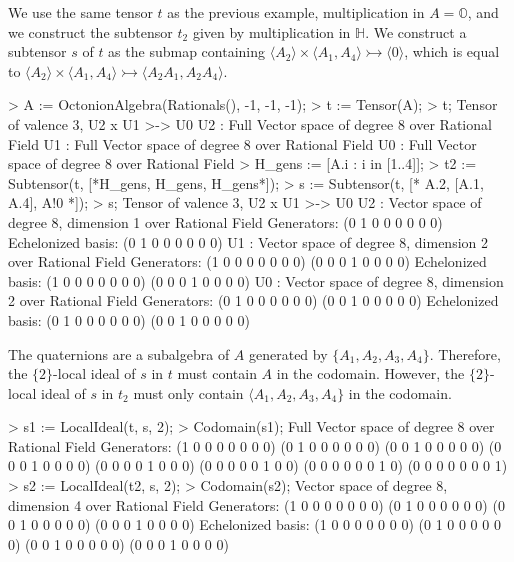 \begin{example}[LocalIdeals]

We use the same tensor $t$ as the previous example, multiplication in $A=\mathbb{O}$, and we construct the subtensor $t_2$ given by multiplication in $\mathbb{H}$.
We construct a subtensor $s$ of $t$ as the submap containing $\langle A_2\rangle \times \langle A_1, A_4\rangle \rightarrowtail \langle 0\rangle$, which is equal to  $\langle A_2\rangle \times \langle A_1, A_4\rangle \rightarrowtail \langle A_2A_1, A_2A_4\rangle$.
\begin{code}
> A := OctonionAlgebra(Rationals(), -1, -1, -1);
> t := Tensor(A);
> t;
Tensor of valence 3, U2 x U1 >-> U0
U2 : Full Vector space of degree 8 over Rational Field
U1 : Full Vector space of degree 8 over Rational Field
U0 : Full Vector space of degree 8 over Rational Field
> H_gens := [A.i : i in [1..4]];
> t2 := Subtensor(t, [*H_gens, H_gens, H_gens*]);
> s := Subtensor(t, [* A.2, [A.1, A.4], A!0 *]);
> s;
Tensor of valence 3, U2 x U1 >-> U0
U2 : Vector space of degree 8, dimension 1 over Rational Field
Generators:
(0 1 0 0 0 0 0 0)
Echelonized basis:
(0 1 0 0 0 0 0 0)
U1 : Vector space of degree 8, dimension 2 over Rational Field
Generators:
(1 0 0 0 0 0 0 0)
(0 0 0 1 0 0 0 0)
Echelonized basis:
(1 0 0 0 0 0 0 0)
(0 0 0 1 0 0 0 0)
U0 : Vector space of degree 8, dimension 2 over Rational Field
Generators:
(0 1 0 0 0 0 0 0)
(0 0 1 0 0 0 0 0)
Echelonized basis:
(0 1 0 0 0 0 0 0)
(0 0 1 0 0 0 0 0)
\end{code}

The quaternions are a subalgebra of $A$ generated by $\{A_1,A_2,A_3,A_4\}$. 
Therefore, the $\{2\}$-local ideal of $s$ in $t$ must contain $A$ in the codomain.
However, the $\{2\}$-local ideal of $s$ in $t_2$ must only contain $\langle A_1, A_2, A_3, A_4\}$ in the codomain.
\begin{code}
> s1 := LocalIdeal(t, s, {2});
> Codomain(s1);
Full Vector space of degree 8 over Rational Field
Generators:
(1 0 0 0 0 0 0 0)
(0 1 0 0 0 0 0 0)
(0 0 1 0 0 0 0 0)
(0 0 0 1 0 0 0 0)
(0 0 0 0 1 0 0 0)
(0 0 0 0 0 1 0 0)
(0 0 0 0 0 0 1 0)
(0 0 0 0 0 0 0 1)
> s2 := LocalIdeal(t2, s, {2});
> Codomain(s2);
Vector space of degree 8, dimension 4 over Rational Field
Generators:
(1 0 0 0 0 0 0 0)
(0 1 0 0 0 0 0 0)
(0 0 1 0 0 0 0 0)
(0 0 0 1 0 0 0 0)
Echelonized basis:
(1 0 0 0 0 0 0 0)
(0 1 0 0 0 0 0 0)
(0 0 1 0 0 0 0 0)
(0 0 0 1 0 0 0 0)
\end{code}
\end{example}


